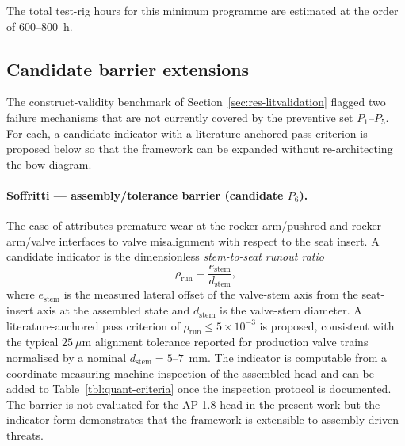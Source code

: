The total test-rig hours for this minimum programme are estimated at
the order of 600--800~h.

\subsection{Candidate barrier extensions}\label{sec:roadmap-barriers}

The construct-validity benchmark of
Section~\ref{sec:res-litvalidation} flagged two failure mechanisms
that are not currently covered by the preventive set
$P_{1}$--$P_{5}$. For each, a candidate indicator with a
literature-anchored pass criterion is proposed below so that the
framework can be expanded without re-architecting the bow diagram.

\paragraph{Soffritti --- assembly/tolerance barrier (candidate
$P_{6}$).} The case of \citet{soffritti2018wornvalvetrain} attributes
premature wear at the rocker-arm/pushrod and rocker-arm/valve
interfaces to valve misalignment with respect to the seat insert.
A candidate indicator is the dimensionless \emph{stem-to-seat runout
ratio}
\begin{equation}
\rho_{\mathrm{run}}=\frac{e_{\mathrm{stem}}}{d_{\mathrm{stem}}},
\label{eq:runout}
\end{equation}
where $e_{\mathrm{stem}}$ is the measured lateral offset of the
valve-stem axis from the seat-insert axis at the assembled state
and $d_{\mathrm{stem}}$ is the valve-stem diameter. A
literature-anchored pass criterion of
$\rho_{\mathrm{run}}\leq 5\times 10^{-3}$ is proposed, consistent
with the typical $25~\mu\mathrm{m}$ alignment tolerance reported for
production valve trains \citep{heisler2002} normalised by a
nominal $d_{\mathrm{stem}}=5$--$7$~mm. The indicator is computable
from a coordinate-measuring-machine inspection of the assembled
head and can be added to Table~\ref{tbl:quant-criteria} once the
inspection protocol is documented. The barrier is not evaluated for
the AP 1.8 head in the present work but the indicator form
demonstrates that the framework is extensible to assembly-driven
threats.


